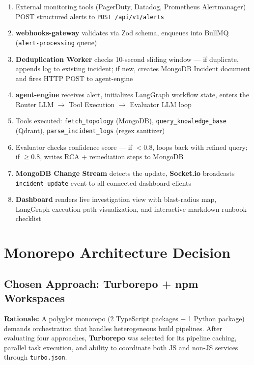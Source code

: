 \documentclass[11pt,a4paper]{article}
\begin{document}
\begin{tcolorbox}[colback=primary!5, colframe=primary, sharp corners, title=\textbf{Complete Alert-to-Remediation Pipeline}]
\begin{enumerate}[leftmargin=*,itemsep=2pt]
  \item External monitoring tools (PagerDuty, Datadog, Prometheus Alertmanager) POST structured alerts to \texttt{POST /api/v1/alerts}
  \item \textbf{webhooks-gateway} validates via Zod schema, enqueues into BullMQ (\texttt{alert-processing} queue)
  \item \textbf{Deduplication Worker} checks 10-second sliding window — if duplicate, appends log to existing incident; if new, creates MongoDB Incident document and fires HTTP POST to agent-engine
  \item \textbf{agent-engine} receives alert, initializes LangGraph workflow state, enters the Router LLM $\rightarrow$ Tool Execution $\rightarrow$ Evaluator LLM loop
  \item Tools executed: \texttt{fetch\_topology} (MongoDB), \texttt{query\_knowledge\_base} (Qdrant), \texttt{parse\_incident\_logs} (regex sanitizer)
  \item Evaluator checks confidence score — if $< 0.8$, loops back with refined query; if $\geq 0.8$, writes RCA + remediation steps to MongoDB
  \item \textbf{MongoDB Change Stream} detects the update, \textbf{Socket.io} broadcasts \texttt{incident-update} event to all connected dashboard clients
  \item \textbf{Dashboard} renders live investigation view with blast-radius map, LangGraph execution path visualization, and interactive markdown runbook checklist
\end{enumerate}
\end{tcolorbox}

\section{Monorepo Architecture Decision}

\subsection{Chosen Approach: Turborepo + npm Workspaces}

\begin{decisionbox}
\textbf{Rationale:} A polyglot monorepo (2 TypeScript packages + 1 Python package) demands
orchestration that handles heterogeneous build pipelines. After evaluating four approaches,
\textbf{Turborepo} was selected for its pipeline caching, parallel task execution, and
ability to coordinate both JS and non-JS services through \texttt{turbo.json}.
\end{decisionbox}
\end{document}
